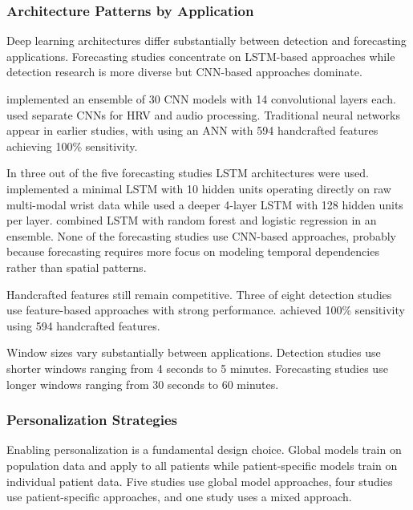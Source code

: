 \subsubsection{Architecture Patterns by Application}

Deep learning architectures differ substantially between detection and forecasting applications. Forecasting studies concentrate on LSTM-based approaches while detection research is more diverse but CNN-based approaches dominate.

\textcite{spahrDeepLearningbasedDetection2025} implemented an ensemble of 30 CNN models with 14 convolutional layers each. \textcite{elemamAutomatedValidatedTool2025} used separate CNNs for HRV and audio processing. Traditional neural networks appear in earlier studies, with \textcite{fineDetectionKeyAutomated2025} using an ANN with 594 handcrafted features achieving 100\% sensitivity.

In three out of the five forecasting studies LSTM architectures were used. \textcite{meiselMachineLearningWristband2020} implemented a minimal LSTM with 10 hidden units operating directly on raw multi-modal wrist data while \textcite{nasseriAmbulatorySeizureForecasting2021} used a deeper 4-layer LSTM with 128 hidden units per layer. \textcite{stirlingForecastingSeizureLikelihood2021} combined LSTM with random forest and logistic regression in an ensemble. None of the forecasting studies use CNN-based approaches, probably because forecasting requires more focus on modeling temporal dependencies rather than spatial patterns.

Handcrafted features still remain competitive. Three of eight detection studies use feature-based approaches with strong performance. \textcite{fineDetectionKeyAutomated2025} achieved 100\% sensitivity using 594 handcrafted features.

Window sizes vary substantially between applications. Detection studies use shorter windows ranging from 4 seconds to 5 minutes. Forecasting studies use longer windows ranging from 30 seconds to 60 minutes.

\subsubsection{Personalization Strategies}
Enabling personalization is a fundamental design choice. Global models train on population data and apply to all patients while patient-specific models train on individual patient data. Five studies use global model approaches, four studies use patient-specific approaches, and one study uses a mixed approach.

